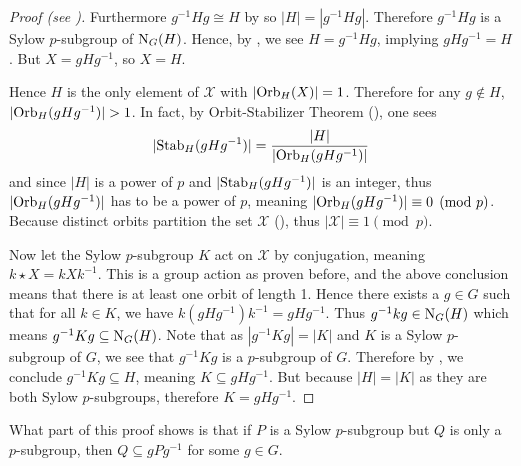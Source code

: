 \begin{proof}[Proof (see {\cite[Theorem 11.10]{humphreys_1996}})]
    Furthermore $g^{-1}Hg \cong H$ by  so $|H| = |g^{-1}Hg|$. Therefore $g^{-1}Hg$ is a Sylow $p$-subgroup of $\mathrm{N}_{G}(H)$. Hence, by , we see $H = g^{-1}Hg$, implying $gHg^{-1} = H$. But $X = gHg^{-1}$, so $X = H$.

    Hence $H$ is the only element of $\mathcal{X}$ with $|\mathrm{Orb}_{H}(X)| = 1$. Therefore for any $g \notin H$, $|\mathrm{Orb}_{H}(gHg^{-1})| > 1$. In fact, by Orbit-Stabilizer Theorem (), one sees
    \[
        |\mathrm{Stab}_{H}(gHg^{-1})| = \frac{|H|}{|\mathrm{Orb}_{H}(gHg^{-1})|}
    \]
    and since $|H|$ is a power of $p$ and $|\mathrm{Stab}_{H}(gHg^{-1})|$ is an integer, thus $|\mathrm{Orb}_{H}(gHg^{-1})|$ has to be a power of $p$, meaning $|\mathrm{Orb}_{H}(gHg^{-1})| \equiv 0 \pmod p$. Because distinct orbits partition the set $\mathcal{X}$ (), thus $|\mathcal{X}| \equiv 1 \pmod p$.

    Now let the Sylow $p$-subgroup $K$ act on $\mathcal{X}$ by conjugation, meaning $k \star X = kXk^{-1}$. This is a group action as proven before, and the above conclusion means that there is at least one orbit of length 1. Hence there exists a $g \in G$ such that for all $k \in K$, we have $k(gHg^{-1})k^{-1} = gHg^{-1}$. Thus $g^{-1}kg \in \mathrm{N}_{G}(H)$ which means $g^{-1}Kg \subseteq \mathrm{N}_{G}(H)$. Note that as $|g^{-1}Kg| = |K|$ and $K$ is a Sylow $p$-subgroup of $G$, we see that $g^{-1}Kg$ is a $p$-subgroup of $G$. Therefore by , we conclude $g^{-1}Kg \subseteq H$, meaning $K \subseteq gHg^{-1}$. But because $|H| = |K|$ as they are both Sylow $p$-subgroups, therefore $K = gHg^{-1}$.
\end{proof}
\begin{remark}
    What part of this proof shows is that if $P$ is a Sylow $p$-subgroup but $Q$ is only a $p$-subgroup, then $Q \subseteq gPg^{-1}$ for some $g \in G$.
\end{remark}

